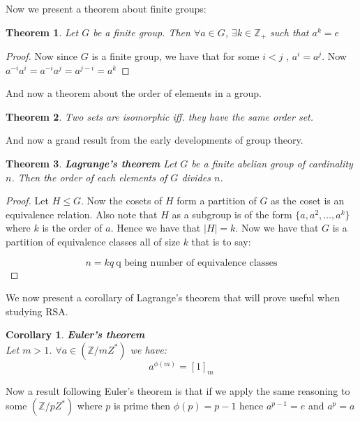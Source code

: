 \documentclass[titlepage]{article}
\newtheorem{theorem}{Theorem}[section]
\newtheorem{cor}{Corollary}
\begin{document}
Now we present a theorem about finite groups:

\begin{theorem}
Let $G$ be a finite group. Then $\forall a \in G$, $\exists k \in \mathbb{Z_{+}}$ such that $a^{k} = e$
\end{theorem}

\begin{proof}
Now since $G$ is a finite group, we have that for some $i < j$ , $a^{i} = a^{j}$. Now
$a^{-i}a^{i} = a^{-i}a^{j} = a^{j-i} = a^{k}$
\end{proof}

And now a theorem about the order of elements in a group. 

\begin{theorem}
Two sets are isomorphic iff. they have the same order set. 
\end{theorem}

And now a grand result from the early developments of group theory.

\begin{theorem}\textbf{Lagrange's theorem}
Let $G$ be a finite abelian group of cardinality $n$. Then the order of each elements of $G$ divides $n$. 
\end{theorem}

\begin{proof}
Let $H \leqslant G$. Now the cosets of $H$ form a partition of $G$ as the coset is an equivalence relation. Also note that $H$ as a subgroup is of the form $\{a,a^{2},\ldots,a^{k}\}$ where $k$ is the order of $a$. Hence we have that $|H| = k$. Now we have that $G$ is a partition of equivalence classes all of size $k$ that is to say:

$$ n = kq \ \text{q being number of equivalence classes}$$
\end{proof}

We now present a corollary of Lagrange's theorem that will prove useful when studying RSA.

\begin{cor}\textbf{Euler's theorem}
\\

Let $m > 1$. $\forall a \in (\mathbb{Z} / mZ^{*})$ we have:
 $$a^{\phi(m)} = [1]_{m}$$
\end{cor}

Now a result following Euler's theorem is that if we apply the same reasoning to some $(\mathbb{Z} / pZ^{*})$ where $p$ is prime then $\phi(p) = p-1$ hence $a^{p-1} = e$ and $a^p = a$
\end{document}
